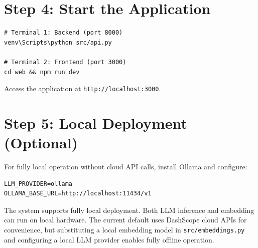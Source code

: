 \documentclass[11pt,a4paper]{report}
\begin{document}
\section*{Step 4: Start the Application}
\begin{verbatim}
# Terminal 1: Backend (port 8000)
venv\Scripts\python src/api.py

# Terminal 2: Frontend (port 3000)
cd web && npm run dev
\end{verbatim}
Access the application at \texttt{http://localhost:3000}.

\section*{Step 5: Local Deployment (Optional)}
For fully local operation without cloud API calls, install Ollama and configure:
\begin{verbatim}
LLM_PROVIDER=ollama
OLLAMA_BASE_URL=http://localhost:11434/v1
\end{verbatim}
The system supports fully local deployment. Both LLM inference and embedding can run on local hardware. The current default uses DashScope cloud APIs for convenience, but substituting a local embedding model in \texttt{src/embeddings.py} and configuring a local LLM provider enables fully offline operation.




\end{document}
